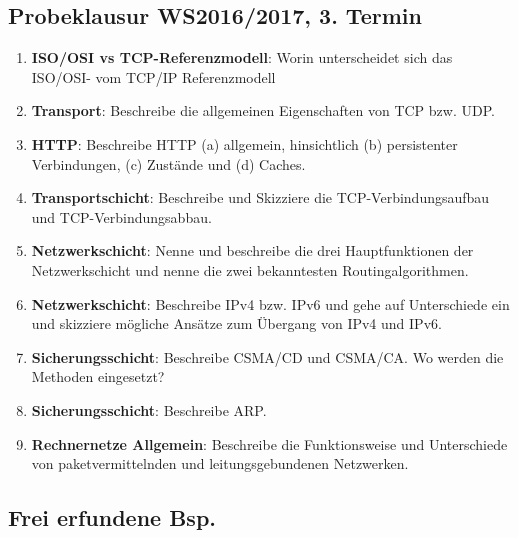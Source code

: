 \documentclass{scrartcl}
\begin{document}
    \subsection{Probeklausur WS2016/2017, 3. Termin}
    \begin{enumerate}
        \item \textbf{ISO/OSI vs TCP-Referenzmodell}: Worin unterscheidet sich das ISO/OSI- vom TCP/IP Referenzmodell
        \item \textbf{Transport}: Beschreibe die allgemeinen Eigenschaften von TCP bzw. UDP.
        \item \textbf{HTTP}: Beschreibe HTTP (a) allgemein, hinsichtlich (b) persistenter Verbindungen, (c) Zustände und (d) Caches.
        \item \textbf{Transportschicht}: Beschreibe und Skizziere die TCP-Verbindungsaufbau und TCP-Verbindungsabbau.
        \item \textbf{Netzwerkschicht}:
        Nenne und beschreibe die drei Hauptfunktionen der Netzwerkschicht und nenne die zwei bekanntesten Routingalgorithmen.
        \item \textbf{Netzwerkschicht}: Beschreibe IPv4 bzw. IPv6 und gehe auf Unterschiede ein und skizziere mögliche Ansätze zum Übergang von IPv4 und IPv6.
        \item \textbf{Sicherungsschicht}: Beschreibe CSMA/CD und CSMA/CA. Wo werden die Methoden eingesetzt?
        \item \textbf{Sicherungsschicht}: Beschreibe ARP.
        \item \textbf{Rechnernetze Allgemein}: Beschreibe die Funktionsweise und Unterschiede von paketvermittelnden und leitungsgebundenen Netzwerken.
    \end{enumerate}

    \subsection{Frei erfundene Bsp.}
\end{document}
